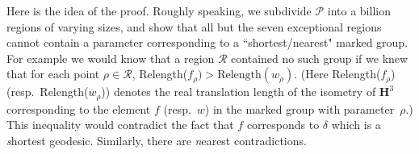 Here is the idea of the proof.
Roughly speaking, we subdivide $\mathcal {P}$ into a billion regions
of varying sizes,
and show that all but the seven exceptional regions cannot contain 
a parameter corresponding to a  
``shortest/nearest" marked group.
For example we would know that 
a region $\mathcal {R}$ contained no such group if we knew that for each 
point $\rho\in \mathcal {R}$,
Relength($f_\rho) > \mathrm {Relength}(w_\rho).$  
(Here Relength($f_\rho$) (resp.\ Relength($w_\rho^{\phantom{|}}$))
denotes the real translation length of the isometry of $\mathbf {H}^3$ 
corresponding to
the element $f$ (resp.\ $w$) in the marked group with parameter~$\rho.$)
This inequality would contradict the fact that $f$ corresponds to $\delta$ 
which is a {\textit shortest} geodesic.  Similarly, there are {\textit nearest}
contradictions.
